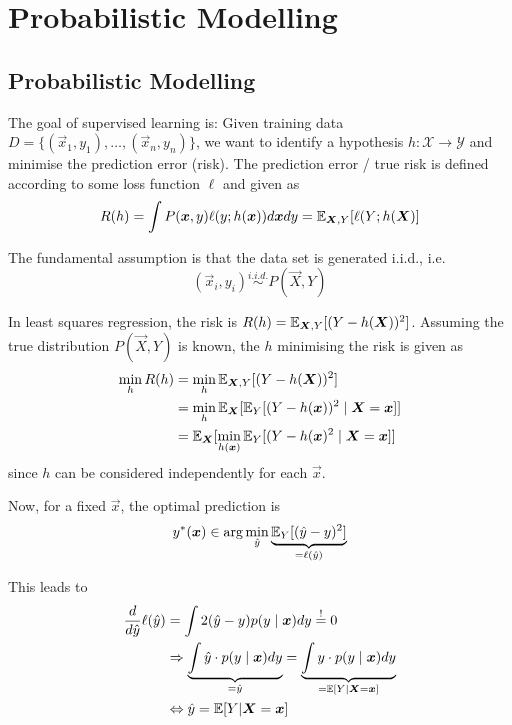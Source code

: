 \chapter{Probabilistic Modelling}

\section{Probabilistic Modelling}
The goal of supervised learning is:
Given training data $D = \{(\vec{x}_1, y_1), \dotsc, (\vec{x}_n, y_n)\}$,
we want to identify a hypothesis $h : \mathcal{X} \to \mathcal{Y}$
and minimise the prediction error (risk).
The prediction error / true risk is
defined according to some loss function
$\ell$ and given as
\begin{equation*}
R(h) = \int{P(\boldsymbol{x}, y) \ell(y; h(\boldsymbol{x})) d\boldsymbol{x} dy}
= \mathbb{E}_{\boldsymbol{X}, Y}[\ell(Y; h(\boldsymbol{X})]
\end{equation*}

The fundamental assumption is that
the data set is generated i.i.d.,
i.e.
\begin{equation*}
(\vec{x}_i, y_i) \overset{i.i.d.}{\sim} P(\vec{X}, Y)
\end{equation*}

In least squares regression,
the risk is
$R(h) = \mathbb{E}_{\boldsymbol{X}, Y}[(Y - h(\boldsymbol{X}))^2]$.
Assuming the true distribution $P(\vec{X}, Y)$ is known,
the $h$ minimising the risk is given as
\begin{align*}
\min_h{R(h)}
&= \min_h{\mathbb{E}_{\boldsymbol{X}, Y}[(Y - h(\boldsymbol{X}))^2]} \\
&= \min_h{\mathbb{E}_{\boldsymbol{X}}[\mathbb{E}_Y[(Y - h(\boldsymbol{x}))^2 \mid \boldsymbol{X} = \boldsymbol{x}]]} \\
&= \mathbb{E}_{\boldsymbol{X}}[
\min_{h(\boldsymbol{x})}{\mathbb{E}_Y[(Y-h(\boldsymbol{x})^2 \mid \boldsymbol{X} = \boldsymbol{x}]}
]
\end{align*}
since $h$ can be considered independently for each $\vec{x}$.

Now, for a fixed $\vec{x}$, the optimal prediction is
\begin{equation*}
y^*(\boldsymbol{x}) \in \arg\min_{\hat{y}}{
	\underbrace{\mathbb{E}_Y[(\hat{y} - y)^2]}_{= \ell(\hat{y})}
}
\end{equation*}

This leads to
\begin{align*}
\frac{d}{d \hat{y}} \ell(\hat{y}) &= \int{2 (\hat{y} - y) p(y \mid \boldsymbol{x}) dy} \overset{!}{=} 0 \\
&\Rightarrow \underbrace{\int{\hat{y} \cdot p(y \mid \boldsymbol{x}) dy}}_{=\hat{y}} = \underbrace{\int{y \cdot p(y \mid \boldsymbol{x}) dy}}_{= \mathbb{E}[Y \mid \boldsymbol{X} = \boldsymbol{x}]} \\
&\Leftrightarrow \hat{y} = \mathbb{E}[Y | \boldsymbol{X} = \boldsymbol{x}]
\end{align*}

